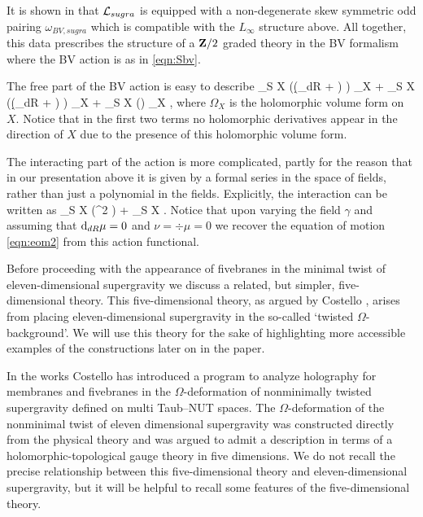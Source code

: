 It is shown in \cite{RSW} that $\mathcal L_{sugra}$ is equipped with a non-degenerate skew symmetric odd pairing $\omega_{BV,sugra}$ which is compatible with the $L_\infty$ structure above.
All together, this data prescribes the structure of a $\mathbf{Z}/2$ graded theory in the BV formalism where the BV action is as in \eqref{eqn:Sbv}.

The free part of the BV action is easy to describe
\beqn
\label{eqn:free}
\int_{S \times X} \left(\gamma (\d_{dR} + \dbar) \mu\right) \Omega_X + \int_{S \times X} (\beta (\d_{dR} + \dbar) \nu) \Omega_X + \int_{S \times X} (\beta \div \mu) \Omega_X ,
\eeqn
where $\Omega_X$ is the holomorphic volume form on~$X$.
Notice that in the first two terms no holomorphic derivatives appear in the direction of $X$ due to the presence of this holomorphic volume form.

The interacting part of the action is more complicated, partly for the reason that in our presentation above it is given by a formal series in the space of fields, rather than just a polynomial in the fields. 
Explicitly, the interaction can be written as
\beqn
\label{eqn:int}
 \int_{S \times X} (\mu^2 \del \gamma)  +  \int_{S \times X} \gamma \del \gamma \del \gamma .
\eeqn
Notice that upon varying the field $\gamma$ and assuming that ${\rm d}_{dR} \mu = 0$ and $\nu = \div \mu = 0$ we recover the equation of motion \eqref{eqn:eom2} from this action functional. 
%

\parsec[s:twistedsugra]

Before proceeding with the appearance of fivebranes in the minimal twist of eleven-dimensional supergravity we discuss a related, but simpler, five-dimensional theory.
This five-dimensional theory, as argued by Costello \cite{CostelloM5}, arises from placing eleven-dimensional supergravity in the so-called `twisted $\Omega$-background'.
We will use this theory for the sake of highlighting more accessible examples of the constructions later on in the paper. 

In the works \cite{CostelloM5,CostelloM2} Costello has introduced a program to analyze holography for membranes and fivebranes in the $\Omega$-deformation of nonminimally twisted supergravity defined on multi Taub--NUT spaces.
The $\Omega$-deformation of the nonminimal twist of eleven dimensional supergravity was constructed directly from the physical theory and was argued to admit a description in terms of a holomorphic-topological gauge theory in five dimensions.
We do not recall the precise relationship between this five-dimensional theory and eleven-dimensional supergravity, but it will be helpful to recall some features of the five-dimensional theory. 

